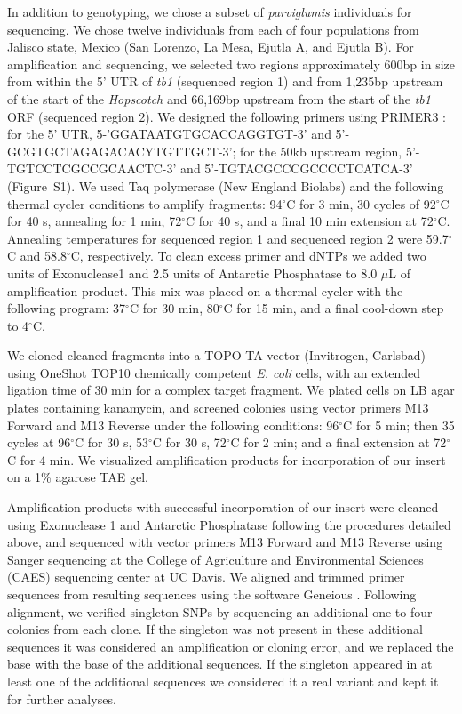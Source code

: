 \documentclass[11pt]{article}
\begin{document}
\begin{linenumbers}
\begin{flushleft}
In addition to genotyping, we chose a subset of \emph{parviglumis} individuals for sequencing. We chose twelve individuals from each of four populations from Jalisco state, Mexico (San Lorenzo, La Mesa, Ejutla A, and Ejutla B). For amplification and sequencing, we selected two regions approximately 600bp in size from within the 5' UTR of \emph{tb1} (sequenced region 1) and from 1,235bp upstream of the start of the \emph{Hopscotch} and 66,169bp upstream from the start of the \emph{tb1} ORF (sequenced region 2). We designed the following primers using PRIMER3 \citep{RozenSkaletsky2000}: for the 5' UTR, {\small 5-'GGATAATGTGCACCAGGTGT-3'} and {\small 5'-GCGTGCTAGAGACACYTGTTGCT-3'}; for the 50kb upstream region, {\small 5'-TGTCCTCGCCGCAACTC-3'} and {\small 5'-TGTACGCCCGCCCCTCATCA-3'} (Figure~S1). We used Taq polymerase (New England Biolabs) and the following thermal cycler conditions to amplify fragments: 94$^{\circ}$C for 3 min, 30 cycles of 92$^{\circ}$C for 40 s, annealing for 1 min, 72$^{\circ}$C for 40 s, and a final 10 min extension at 72$^{\circ}$C. Annealing temperatures for sequenced region 1 and sequenced region 2 were 59.7$^{\circ}$C and 58.8$^{\circ}$C, respectively. To clean excess primer and dNTPs we added two units of Exonuclease1 and 2.5 units of Antarctic Phosphatase to 8.0 $\mu$L of amplification product. This mix was placed on a thermal cycler with the following program: 37$^{\circ}$C for 30 min, 80$^{\circ}$C for 15 min, and a final cool-down step to 4$^{\circ}$C. 

We cloned cleaned fragments into a TOPO-TA vector (Invitrogen, Carlsbad) using OneShot TOP10 chemically competent \emph{E. coli} cells, with an extended ligation time of 30 min for a complex target fragment. We plated cells on LB agar plates containing kanamycin, and screened colonies using vector primers M13 Forward and M13 Reverse under the following conditions: 96$^{\circ}$C for 5 min; then 35 cycles at 96$^{\circ}$C for 30 s, 53$^{\circ}$C for 30 s, 72$^{\circ}$C for 2 min; and a final extension at 72$^{\circ}$C for 4 min. We visualized amplification products for incorporation of our insert on a 1\% agarose TAE gel.

Amplification products with successful incorporation of our insert were cleaned using Exonuclease 1 and Antarctic Phosphatase following the procedures detailed above, and sequenced with vector primers M13 Forward and M13 Reverse using Sanger sequencing at the College of Agriculture and Environmental Sciences (CAES) sequencing center at UC Davis. We aligned and trimmed primer sequences from resulting sequences using the software Geneious \citep{Kearse2012}. Following alignment, we verified singleton SNPs by sequencing an additional one to four colonies from each clone. If the singleton was not present in these additional sequences it was considered an amplification or cloning error, and we replaced the base with the base of the additional sequences. If the singleton appeared in at least one of the additional sequences we considered it a real variant and kept it for further analyses. 


\end{flushleft}
\end{linenumbers}
\end{document}
